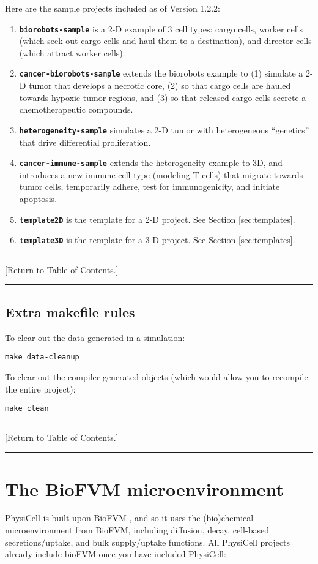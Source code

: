 \documentclass[12pt]{article}
\renewcommand{\v}{\verb}
\newcommand{\smallcode}[1]{\textbf{\texttt{#1}}}
\newcommand{\blue}[1]{\textcolor{blue}{#1}}
\newcommand{\DONE}{}%
\newcommand{\TOClink}{\begin{center}\hrule\vskip-10pt\phantom{.}\hfill[Return to \hyperlink{TOC}{Table of Contents}.]\hfill\phantom{.}\vskip3pt\hrule\end{center}}
\begin{document}
Here are the sample projects included as of Version 1.2.2: 
\begin{enumerate}
\item 
\smallcode{biorobots-sample} is a 2-D example of 3 cell types: cargo cells, worker cells (which seek out cargo cells and 
haul them to a destination), and director cells (which attract worker cells). 

\item 
\smallcode{cancer-biorobots-sample} extends the biorobots example to (1) simulate a 2-D tumor that develops a necrotic 
core, (2) so that cargo cells are hauled towards hypoxic tumor regions, and (3) so that released cargo cells secrete 
a chemotherapeutic compounds. 

\item
\smallcode{heterogeneity-sample} simulates a 2-D tumor with heterogeneous ``genetics'' that drive differential proliferation. 

\item 
\smallcode{cancer-immune-sample} extends the heterogeneity example to 3D, and introduces a new immune 
cell type (modeling T cells) that migrate towards tumor cells, temporarily adhere, test for immunogenicity, 
and initiate apoptosis. 

\item 
\smallcode{template2D} is the template for a 2-D project. See Section \ref{sec:templates}. 

\item 
\smallcode{template3D} is the template for a 3-D project. See Section \ref{sec:templates}. 
\end{enumerate}

\TOClink 

\subsection{Extra makefile rules}
\label{sec:makefiles}
To clear out the data generated in a simulation: 

\v|make data-cleanup|

To clear out the compiler-generated objects (which would allow you to recompile the entire project): 

\v|make clean| 

\TOClink 

\section{The BioFVM microenvironment \DONE}
PhysiCell is built upon BioFVM \cite{ref:BioFVM}, and so it uses the (bio)chemical microenvironment from BioFVM, 
including diffusion, decay, cell-based secretions/uptake, and bulk supply/uptake functions. All 
PhysiCell projects already include bioFVM once you have included PhysiCell: 
\end{document}

